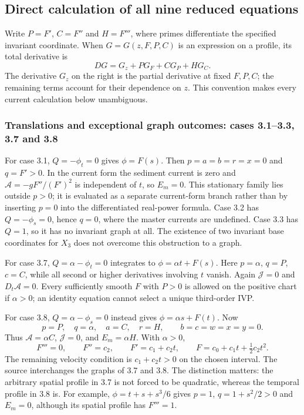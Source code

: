 \subsection{Direct calculation of all nine reduced equations}
Write $P=F'$, $C=F''$ and $H=F'''$, where primes differentiate the
specified invariant coordinate. When $G=G(z,F,P,C)$ is an expression
on a profile, its total derivative is
\begin{equation}
 D G=G_z+PG_F+CG_P+HG_C.
 \label{eq:sve-profile-total}
\end{equation}
The derivative $G_z$ on the right is the partial derivative at fixed
$F,P,C$; the remaining terms account for their dependence on $z$.
This convention makes every current calculation below unambiguous.

\subsubsection{Translations and exceptional graph outcomes: cases 3.1--3.3, 3.7 and 3.8}
For case 3.1, $Q=-\phi_t=0$ gives $\phi=F(s)$. Then
$p=a=b=r=x=0$ and $q=F'>0$. In the current form the sediment
current is zero and $\mathcal A=-gF''/(F')^2$ is independent of $t$,
so $E_m=0$. This stationary family lies outside $p>0$; it is evaluated
as a separate current-form branch rather than by inserting $p=0$
into the differentiated real-power formula.
Case 3.2 has $Q=-\phi_s=0$, hence $q=0$, where the master currents
are undefined. Case 3.3 has $Q=1$, so it has no invariant graph at all.
The existence of two invariant base coordinates for $X_3$ does not
overcome this obstruction to a graph.

For case 3.7, $Q=\alpha-\phi_t=0$ integrates to
$\phi=\alpha t+F(s)$. Here $p=\alpha$, $q=P$, $c=C$, while
all second or higher derivatives involving $t$ vanish. Again
$\mathcal J=0$ and $D_t\mathcal A=0$. Every sufficiently smooth $F$
with $P>0$ is allowed on the positive chart if $\alpha>0$; an
identity equation cannot select a unique third-order IVP.

For case 3.8, $Q=\alpha-\phi_s=0$ instead gives
$\phi=\alpha s+F(t)$. Now
\[
 p=P,\quad q=\alpha,\quad a=C,\quad r=H,
 \qquad b=c=w=x=y=0.
\]
Thus $\mathcal A=\alpha C$, $\mathcal J=0$, and
$E_m=\alpha H$. With $\alpha>0$,
\begin{equation}
 F'''=0,\qquad F''=c_2,\qquad F'=c_1+c_2t,\qquad
 F=c_0+c_1t+\tfrac12c_2t^2.
 \label{eq:sve-quadratic-reduction}
\end{equation}
The remaining velocity condition is $c_1+c_2t>0$ on the chosen interval.
The source interchanges the graphs of 3.7 and 3.8. The distinction matters:
the arbitrary spatial profile in 3.7 is not forced to be quadratic, whereas
the temporal profile in 3.8 is. For example,
$\phi=t+s+s^3/6$ gives $p=1$, $q=1+s^2/2>0$ and $E_m=0$, although
its spatial profile has $F'''=1$.

